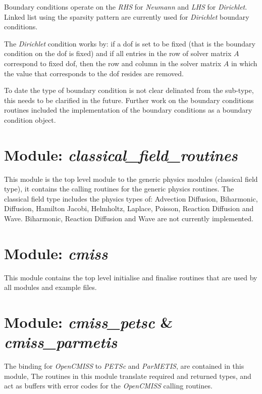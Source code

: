 Boundary conditions operate on the \emph{RHS} for \emph{Neumann} and 
\emph{LHS} for \emph{Dirichlet}. Linked list using the sparsity pattern are 
currently used for \emph{Dirichlet} boundary conditions.

The \emph{Dirichlet} condition works by: if a dof is set to be fixed (that is the 
boundary condition on the dof is fixed) and if all entries in the row of solver 
matrix $A$ correspond to fixed dof, then the row and column in the solver
matrix $A$ in which the value that corresponds to the dof resides are removed. 

To date the type of boundary condition is not clear delinated from the sub-type,
this needs to be clarified in the future. Further work on the boundary conditions
routines included the implementation of the boundary conditions as a boundary
condition object.


\section{Module: \emph{classical\_field\_routines}}
\label{sec:classicalfieldroutines}

This module is the top level module to the generic physics modules (classical 
field type), it contains the calling routines for the generic physics routines. 
The classical field type includes the physics types of: Advection Diffusion, 
Biharmonic, Diffusion, Hamilton Jacobi, Helmholtz, Laplace, Poisson, Reaction 
Diffusion and Wave. Biharmonic, Reaction Diffusion and Wave are not currently 
implemented.


\section{Module: \emph{cmiss}}
\label{sec:cmiss}

This module contains the top level initialise and finalise routines that are
used by all modules and example files.


\section{Module: \emph{cmiss\_petsc} \& \emph{cmiss\_parmetis}}
\label{sec:cmisspetscandcmissparmetis}

The binding for \emph{OpenCMISS} to \emph{PETSc} and \emph{ParMETIS}, 
are contained in this module, The routines in this module translate 
required and returned types, and act as buffers with error codes for the 
\emph{OpenCMISS} calling routines.


